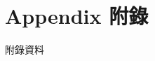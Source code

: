 \titleformat{\chapter}{\normalfont\huge\bfseries}{}{1em}{}

\chapter{Appendix 附錄}
\label{ch:appendix}

附錄資料
